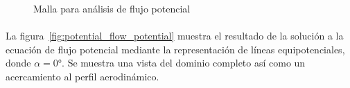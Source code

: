 \documentclass[letterpaper, openright, 12pt]{book}
\begin{document}
    \begin{figure}[htbp!]
        \centering

        \caption{Malla para análisis de flujo potencial}
        \label{fig:potential_flow_mesh}
    \end{figure}

    \paragraph*{}
    La figura~\ref{fig:potential_flow_potential} muestra el resultado de la
    solución a la ecuación de flujo potencial mediante la representación de
    líneas equipotenciales, donde $\alpha = 0\si{\degree}$. Se muestra una vista
    del dominio completo así como un acercamiento al perfil aerodinámico.
\end{document}
